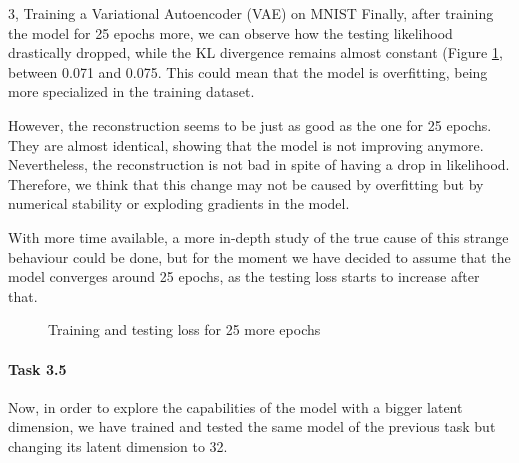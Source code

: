 \begin{task}{3, Training a Variational Autoencoder (VAE) on MNIST}
Finally, after training the model for 25 epochs more, we can observe how the testing likelihood drastically dropped, while the KL divergence remains almost constant (Figure \ref{loss50}, between 0.071 and 0.075. This could mean that the model is overfitting, being more specialized in the training dataset. 

However, the reconstruction seems to be just as good as the one for 25 epochs. They are almost identical, showing that the model is not improving anymore. Nevertheless, the reconstruction is not bad in spite of having a drop in likelihood. Therefore, we think that this change may not be caused by overfitting but by numerical stability or exploding gradients in the model. 

With more time available, a more in-depth study of the true cause of this strange behaviour could be done, but for the moment we have decided to assume that the model converges around 25 epochs, as the testing loss starts to increase after that.

\begin{figure}[H]
    \centering
    \caption{Training and testing loss for 25 more epochs}
    \label{loss50}
\end{figure}

\paragraph{Task 3.5} Now, in order to explore the capabilities of the model with a bigger latent dimension, we have trained and tested the same model of the previous task but changing its latent dimension to 32. 


\end{task}
